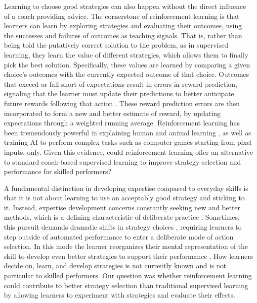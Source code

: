 \documentclass{article}
\begin{document}
Learning to choose good strategies can also happen without the direct influence of a coach providing advice. The cornerstone of reinforcement learning \cite{sutton_reinforcement_2018} is that learners can learn by exploring strategies and evaluating their outcomes, using the successes and failures of outcomes as teaching signals. That is, rather than being told the putatively correct solution to the problem, as in supervised learning, they learn the value of different strategies, which allows them to finally pick the best solution. Specifically, these values are learned by comparing a given choice's outcomes with the currently expected outcome of that choice. Outcomes that exceed or fall short of expectations result in errors in reward prediction, signaling that the learner must update their predictions to better anticipate future rewards following that action \cite{rescorla_theory_1972}. These reward prediction errors are then incorporated to form a new and better estimate of reward, by updating expectations through a weighted running average. Reinforcement learning has been tremendously powerful in explaining human and animal learning \cite{waelti_dopamine_2001, schultz_neural_1997, pessiglione_dopamine-dependent_2006}, as well as training AI to perform complex tasks such as computer games starting from pixel inputs, only\cite{mnih_human-level_2015}. Given this evidence, could reinforcement learning offer an alternative to standard coach-based supervised learning to improve strategy selection and performance for skilled performers?

A fundamental distinction in developing expertise compared to everyday skills is that it is not about learning to use an acceptably good strategy and sticking to it. Instead, expertise development concerns constantly seeking new and better methods, which is a defining characteristic of deliberate practice \cite{ericsson_development_2003, ericsson_expert_1994, ericsson_role_1993}. Sometimes, this pursuit demands dramatic shifts in strategy choices \cite{taylor_cerebellar_2014, taylor_role_2012, gray_plateaus_2017}, requiring learners to step outside of automated  performance to enter a deliberate mode of action selection\cite{du_relationship_2022}.  In this mode the learner reorganizes their mental representation of the skill to develop even better strategies to support their performance \cite{du_relationship_2022}. How learners decide on, learn, and develop strategies is not currently known\cite{taylor_role_2012, taylor_cerebellar_2014, chen_effects_2018} and is not particular to skilled performers. Our question was whether reinforcement learning could contribute to better strategy selection than traditional supervised learning by allowing learners to experiment with strategies and evaluate their effects. 
\end{document}
